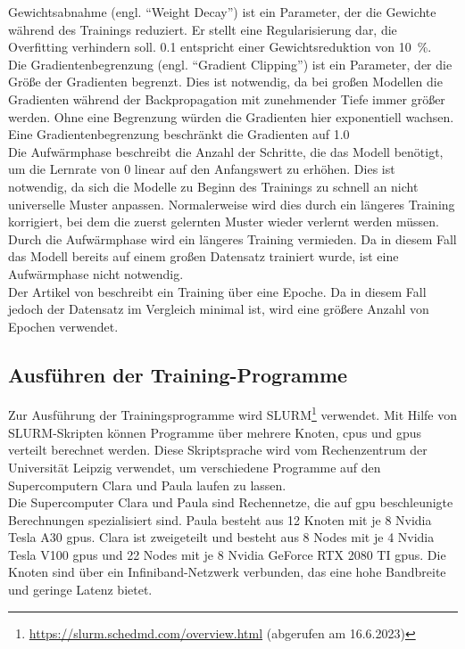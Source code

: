 Gewichtsabnahme (engl. \enquote{Weight Decay}) ist ein Parameter, der die Gewichte während des Trainings reduziert.
Er stellt eine Regularisierung dar, die Overfitting verhindern soll.
\SI{0,1}{} entspricht einer Gewichtsreduktion von \SI{10}{\percent}.\\

Die Gradientenbegrenzung (engl. \enquote{Gradient Clipping}) ist ein Parameter, der die Größe der Gradienten begrenzt.
Dies ist notwendig, da bei großen Modellen die Gradienten während der Backpropagation mit zunehmender Tiefe immer größer werden.
Ohne eine Begrenzung würden die Gradienten hier exponentiell wachsen.
Eine Gradientenbegrenzung beschränkt die Gradienten auf \SI{1,0}{}\\

Die Aufwärmphase beschreibt die Anzahl der Schritte, die das Modell benötigt, um die Lernrate von $0$ linear auf den Anfangswert zu erhöhen.
Dies ist notwendig, da sich die Modelle zu Beginn des Trainings zu schnell an nicht universelle Muster anpassen.
Normalerweise wird dies durch ein längeres Training korrigiert, bei dem die zuerst gelernten Muster wieder verlernt werden müssen.
Durch die Aufwärmphase wird ein längeres Training vermieden.
Da in diesem Fall das Modell bereits auf einem großen Datensatz trainiert wurde, ist eine Aufwärmphase nicht notwendig.\\

Der Artikel von \citet{llama} beschreibt ein Training über eine Epoche.
Da in diesem Fall jedoch der Datensatz im Vergleich minimal ist, wird eine größere Anzahl von Epochen verwendet.\\

\subsection{Ausführen der Training-Programme}

Zur Ausführung der Trainingsprogramme wird SLURM\footnote{\url{https://slurm.schedmd.com/overview.html} (abgerufen am 16.6.2023)} verwendet.
Mit Hilfe von SLURM-Skripten können Programme über mehrere Knoten, \ac{cpu}s und \ac{gpu}s verteilt berechnet werden.
Diese Skriptsprache wird vom Rechenzentrum der Universität Leipzig verwendet, um verschiedene Programme auf den Supercomputern Clara und Paula laufen zu lassen.\\

Die Supercomputer Clara und Paula sind Rechennetze, die auf \ac{gpu} beschleunigte Berechnungen spezialisiert sind.
Paula besteht aus 12 Knoten mit je 8 Nvidia Tesla A30 \ac{gpu}s.
Clara ist zweigeteilt und besteht aus 8 Nodes mit je 4 Nvidia Tesla V100 \ac{gpu}s und 22 Nodes mit je 8 Nvidia GeForce RTX 2080 TI \ac{gpu}s.
Die Knoten sind über ein Infiniband-Netzwerk verbunden, das eine hohe Bandbreite und geringe Latenz bietet.\\

